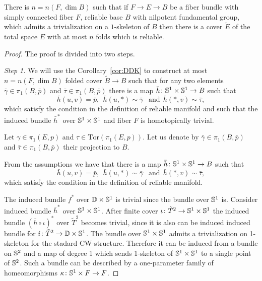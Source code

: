 \documentclass{amsart}
\begin{document}
\begin{claim} 
There is $n=n(F,\dim B)$ such that if $F\to E\to B$ 
be a fiber bundle with 
simply connected fiber $F$, reliable base $B$ with nilpotent fundamental group,
which admits a trivialization on a $1$-skeleton 
of $B$ then there is a cover $\tilde E$ of the  total space $E$ with at most $n$ folds which is reliable.
\end{claim}

\begin{proof} The proof is divided into two steps.

\noindent\textit{Step 1.} 
We will use the Corollary~\ref{cor:DDK} 
to construct 
at most $n=n(F,\dim B)$ folded cover $\widetilde B\to B$ 
such that for any two elements $\bar\gamma\in \pi_1(B,\bar p)$ and $\bar\tau\in \pi_1(B,\bar p)$ there is a map 
$\bar h\colon {\Bbb S}^1\times {\Bbb S}^1\to B$ such that 
$$\bar h(u,v)=\bar p,\ \ 
\bar h(u,*)\sim\bar\gamma\ \ \text{ and}\ \ 
\bar h(*,v)\sim\bar\tau,$$
which satisfy the condition in the  definition of reliable manifold and such that the induced bundle $\bar h^*$ over ${\Bbb S}^1\times {\Bbb S}^1$ and fiber $F$ is homotopically trivial.

Let $\gamma\in \pi_1(E,p)$ and $\tau\in \mathrm{Tor}(\pi_1(E,p))$. 
Let us denote by $\bar\gamma\in \pi_1(B,\bar p)$ and 
$\bar\tau\in \pi_1(B,\bar p)$ their projection to $B$.

From the assumptions we have 
that there is a map 
$\bar h\colon {\Bbb S}^1\times {\Bbb S}^1\to B$ such that 
$$\bar h(u,v)=\bar p,\ \ 
\bar h(u,*)\sim\bar\gamma\ \ \text{ and}\ \ 
\bar h(*,v)\sim\bar\tau,$$
which satisfy the condition in the definition of reliable manifold.

The  induced bundle $f^*$ over $\mathbb{D}\times {\Bbb S}^1$ 
is trivial since the bundle over ${\Bbb S}^1$ is. 
Consider induced bundle $\bar h^*$ over ${\Bbb S}^1\times {\Bbb S}^1$. 
After finite cover $\iota\colon \tilde T^2\to {\Bbb S}^1\times {\Bbb S}^1$ the induced bundle 
$(\bar h \circ \iota)^*$ over $\tilde T^2$ becomes trivial, since it is also can be induced induced bundle for $i\colon \tilde T^2\to \mathbb{D}\times {\Bbb S}^1$.
The bundle over ${\Bbb S}^1\times {\Bbb S}^1$ admits a trivialization on 1-skeleton 
for the stadard CW-structure. 
Therefore it can be induced from a bundle on ${\Bbb S}^2$ and a map of degree 1 
which sends 1-skeleton of ${\Bbb S}^1\times {\Bbb S}^1$ to a single point of ${\Bbb S}^2$. 
Such a bundle can be described by a one-parameter family of homeomorphisms 
$\kappa\colon {\Bbb S}^1\times F\to F$.


\end{proof}
\end{document}

